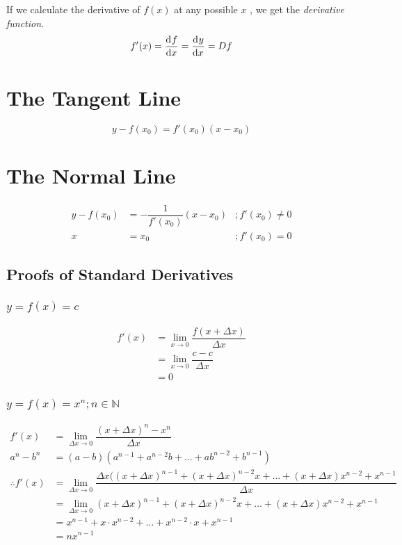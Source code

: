 \documentclass[fleqn]{article}
\theoremstyle{definition}
\theoremstyle{theorem}
\theoremstyle{remark}
\begin{document}
If we calculate the derivative of $f(x)$ at any possible $x$ , we get the \emph{derivative function}.
\begin{equation*}
	f'(x) = \dod{f}{x} = \dod{y}{x} = D f
\end{equation*}

\section{The Tangent Line}

\begin{equation*}
	y - f(x_0) = f'(x_0)(x - x_0)
\end{equation*}

\section{The Normal Line}

\begin{align*}
	y - f(x_0) &= - \dfrac{1}{f'(x_0)} (x - x_0) &; f'(x_0) \neq 0\\
	x &= x_0 &; f'(x_0) = 0
\end{align*}

\subsection{Proofs of Standard Derivatives}
  
\subsubsection{$y = f(x) = c$}

\begin{align*}
	f'(x) &= \lim\limits_{x \rightarrow 0} \dfrac{f(x + \Delta x)}{\Delta x}\\
	&= \lim\limits_{x \rightarrow 0} \dfrac{c - c}{\Delta x}\\
	&= 0
\end{align*}

\subsubsection{$y = f(x) = x^n ; n \in \mathbb{N}$}

\begin{align*}
	f'(x) &= \lim\limits_{\Delta x \rightarrow 0} \dfrac{(x + \Delta x)^n - x^n}{\Delta x}\\
	a^n - b^n &= (a-b)(a^{n-1} + a^{n-2} b + \dots + a b^{n-2} + b^{n-1})\\
	\therefore f'(x) &= \lim\limits_{\Delta x \rightarrow 0} \dfrac{\Delta x((x + \Delta x)^{n-1} + (x + \Delta x)^{n-2} x + \dots + (x + \Delta x) x^{n-2} + x^{n-1}}{\Delta x}\\
	&= \lim\limits_{\Delta x \rightarrow 0} (x + \Delta x)^{n-1} + (x + \Delta x)^{n-2} x + \dots + (x + \Delta x) x^{n-2} + x^{n-1}\\
	&= x^{n-1} + x \cdot x^{n-2} + \dots + x^{n-2} \cdot x + x^{n-1} \\
	&= n x^{n-1}
\end{align*}
\end{document}
